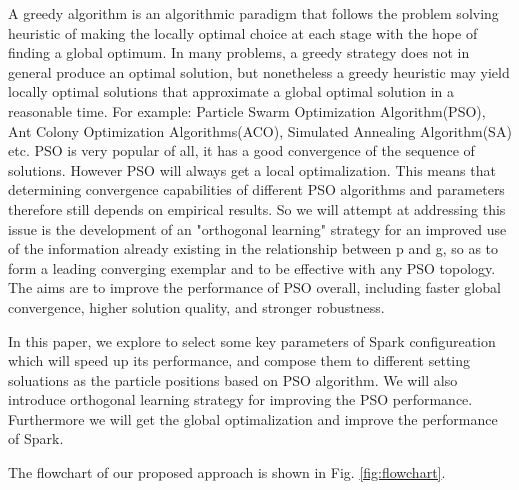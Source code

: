 \par A greedy algorithm is an algorithmic paradigm that follows the problem solving heuristic of making the locally optimal choice at each stage\cite{greedy} with the hope of finding a global optimum. In many problems, a greedy strategy does not in general produce an optimal solution, but nonetheless a greedy heuristic may yield locally optimal solutions that approximate a global optimal solution in a reasonable time. For example: Particle Swarm Optimization Algorithm(PSO), Ant Colony Optimization Algorithms(ACO), Simulated Annealing Algorithm(SA) etc.  PSO is very popular of all, it has a good convergence of the sequence of solutions. However PSO will always get a local optimalization. This means that determining convergence capabilities of different PSO algorithms and parameters therefore still depends on empirical results. So we will attempt at addressing this issue is the development of an "orthogonal learning" strategy for an improved use of the information already existing in the relationship between p and g, so as to form a leading converging exemplar and to be effective with any PSO topology. The aims are to improve the performance of PSO overall, including faster global convergence, higher solution quality, and stronger robustness\cite{PSO2011}.
\par In this paper, we explore to select some key parameters of Spark configureation which will speed up its performance, and compose them to different setting soluations as the particle positions based on PSO algorithm.  We will also introduce  orthogonal learning strategy for improving the PSO performance. Furthermore we will get the global optimalization and improve the performance of Spark.
\par The flowchart of our proposed approach is shown in Fig. \ref{fig:flowchart}.
